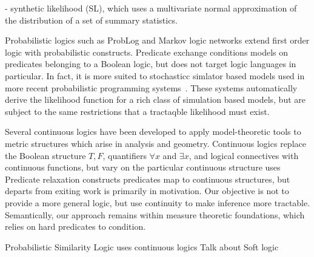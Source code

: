 -  synthetic likelihood (SL), which uses a multivariate normal approximation of the distribution of a set of summary statistics. 

Probabilistic logics such as ProbLog \cite{richardson2006markov} and Markov logic networks \cite{de2007problog} extend first order logic with probabilistic constructs.
Predicate exchange conditions models on predicates belonging to a Boolean logic, but does not target logic languages in particular.
In fact, it is more suited to stochasticc simlator based models used in more recent probabilistic programming systems~\citep{milch20071, wood2014new,mansinghka2014venture,goodman2008church,carpenter2017stan}.  These systems automatically derive the likelihood function for a rich class of simulation based models, but are subject to the same restrictions that a tractaqble likelihood must exist.


Several continuous logics have been developed to apply model-theoretic tools to metric structures which arise in analysis and geometry.
Continuous logics replace the Boolean structure ${T, F}$, quantifiers $\forall x$ and $\exists x$, and logical connectives with continuous functions,
but vary on the particular continuous structure uses
Predicate relaxation constructs predicates map to continuous structures, but departs from exiting work is primarily in motivation.
Our objective is not to provide a more general logic, but use continuity to make inference more tractable.
Semantically, our approach remains within measure theoretic foundations, which relies on hard predicates to condition.


Probabilistic Similarity Logic \cite{brocheler2012probabilistic,kimmig2012short} uses continuous logics 
Talk about Soft logic



